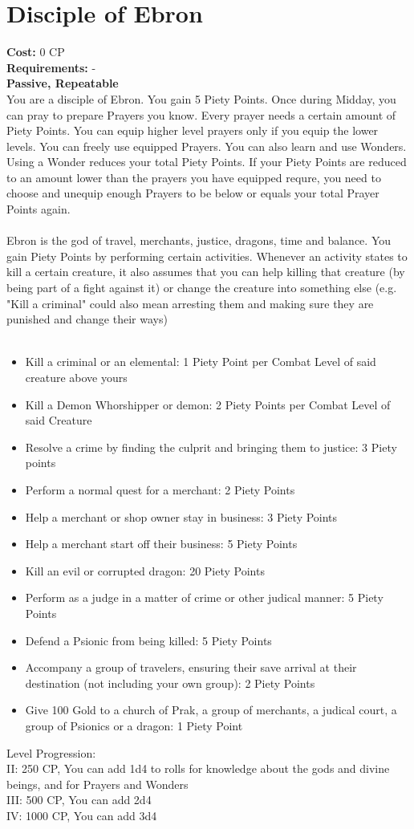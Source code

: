 \section{Disciple of Ebron}
\textbf{Cost:} 0 CP\\
\textbf{Requirements:} - \\
\textbf{Passive, Repeatable}\\
You are a disciple of Ebron. You gain 5 Piety Points. Once during Midday, you can pray to prepare Prayers you know. Every prayer needs a certain amount of Piety Points. You can equip higher level prayers only if you equip the lower levels. You can freely use equipped Prayers. You can also learn and use Wonders. Using a Wonder reduces your total Piety Points. If your Piety Points are reduced to an amount lower than the prayers you have equipped requre, you need to choose and unequip enough Prayers to be below or equals your total Prayer Points again.\\
\\
Ebron is the god of travel, merchants, justice, dragons, time and balance. You gain Piety Points by performing certain activities. Whenever an activity states to kill a certain creature, it also assumes that you can help killing that creature (by being part of a fight against it) or change the creature into something else (e.g. "Kill a criminal" could also mean arresting them and making sure they are punished and change their ways)\\
\\
\begin{itemize}
	\item Kill a criminal or an elemental: 1 Piety Point per Combat Level of said creature above yours
	\item Kill a Demon Whorshipper or demon: 2 Piety Points per Combat Level of said Creature
	\item Resolve a crime by finding the culprit and bringing them to justice: 3 Piety points
	\item Perform a normal quest for a merchant: 2 Piety Points
	\item Help a merchant or shop owner stay in business: 3 Piety Points
	\item Help a merchant start off their business: 5 Piety Points
	\item Kill an evil or corrupted dragon: 20 Piety Points
	\item Perform as a judge in a matter of crime or other judical manner: 5 Piety Points
	\item Defend a Psionic from being killed: 5 Piety Points
	\item Accompany a group of travelers, ensuring their save arrival at their destination (not including your own group): 2 Piety Points
	\item Give 100 Gold to a church of Prak, a group of merchants, a judical court, a group of Psionics or a dragon: 1 Piety Point
\end{itemize}

Level Progression:\\
II: 250 CP, You can add 1d4 to rolls for knowledge about the gods and divine beings, and for Prayers and Wonders\\
III: 500 CP, You can add 2d4\\
IV: 1000 CP, You can add 3d4\\